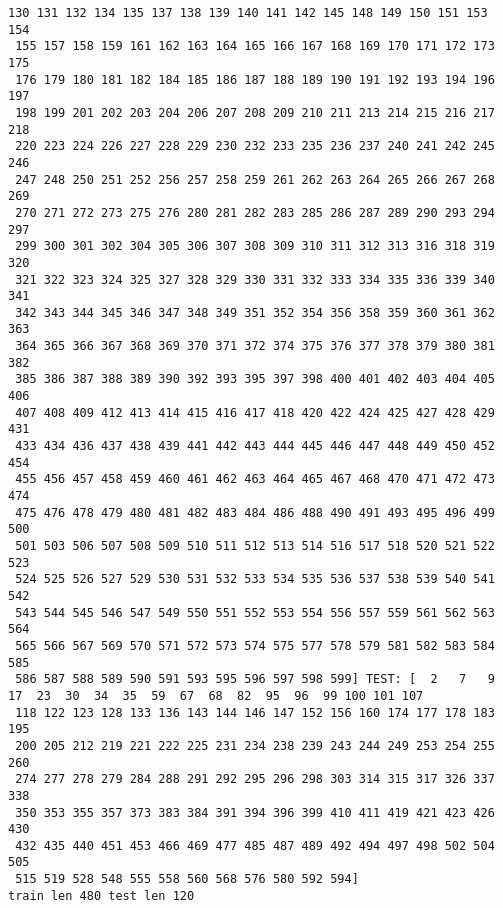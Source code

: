 \documentclass[11pt]{article}
\begin{document}
\begin{Verbatim}[commandchars=\\\{\}]
 130 131 132 134 135 137 138 139 140 141 142 145 148 149 150 151 153 154
 155 157 158 159 161 162 163 164 165 166 167 168 169 170 171 172 173 175
 176 179 180 181 182 184 185 186 187 188 189 190 191 192 193 194 196 197
 198 199 201 202 203 204 206 207 208 209 210 211 213 214 215 216 217 218
 220 223 224 226 227 228 229 230 232 233 235 236 237 240 241 242 245 246
 247 248 250 251 252 256 257 258 259 261 262 263 264 265 266 267 268 269
 270 271 272 273 275 276 280 281 282 283 285 286 287 289 290 293 294 297
 299 300 301 302 304 305 306 307 308 309 310 311 312 313 316 318 319 320
 321 322 323 324 325 327 328 329 330 331 332 333 334 335 336 339 340 341
 342 343 344 345 346 347 348 349 351 352 354 356 358 359 360 361 362 363
 364 365 366 367 368 369 370 371 372 374 375 376 377 378 379 380 381 382
 385 386 387 388 389 390 392 393 395 397 398 400 401 402 403 404 405 406
 407 408 409 412 413 414 415 416 417 418 420 422 424 425 427 428 429 431
 433 434 436 437 438 439 441 442 443 444 445 446 447 448 449 450 452 454
 455 456 457 458 459 460 461 462 463 464 465 467 468 470 471 472 473 474
 475 476 478 479 480 481 482 483 484 486 488 490 491 493 495 496 499 500
 501 503 506 507 508 509 510 511 512 513 514 516 517 518 520 521 522 523
 524 525 526 527 529 530 531 532 533 534 535 536 537 538 539 540 541 542
 543 544 545 546 547 549 550 551 552 553 554 556 557 559 561 562 563 564
 565 566 567 569 570 571 572 573 574 575 577 578 579 581 582 583 584 585
 586 587 588 589 590 591 593 595 596 597 598 599] TEST: [  2   7   9  17  23  30  34  35  59  67  68  82  95  96  99 100 101 107
 118 122 123 128 133 136 143 144 146 147 152 156 160 174 177 178 183 195
 200 205 212 219 221 222 225 231 234 238 239 243 244 249 253 254 255 260
 274 277 278 279 284 288 291 292 295 296 298 303 314 315 317 326 337 338
 350 353 355 357 373 383 384 391 394 396 399 410 411 419 421 423 426 430
 432 435 440 451 453 466 469 477 485 487 489 492 494 497 498 502 504 505
 515 519 528 548 555 558 560 568 576 580 592 594]
train len 480 test len 120

    \end{Verbatim}
\end{document}
